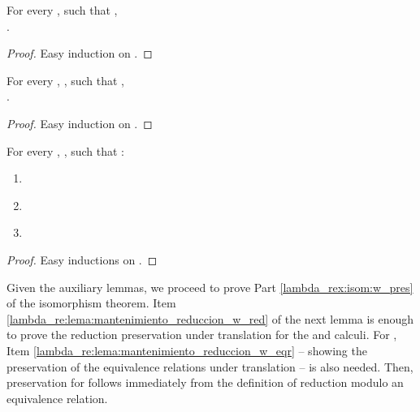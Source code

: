 \begin{lemma}\label{lambda_re:lema:w_swap}
For every ,  such that ,\\
.
    \begin{proof}
    \vspace{-.07cm}
    Easy induction on .
    \end{proof}
\end{lemma}

\begin{lemma}\label{lambda_re:lema:w_incrementos}
For every , ,  such that , \\
.
    \begin{proof}
    \vspace{-.07cm}
    Easy induction on .
    \end{proof}
\end{lemma}

\begin{lemma}\label{lambda_regc:lema:w_gc}
For every , ,  such that  :
    \vspace{-.07cm}
    \begin{enumerate}
        \item \label{lambda_regc:lema:w_gc:not} 

        \item \label{lambda_regc:lema:w_gc:in} 

        \item \label{lambda_regc:lema:w_gc:dec} 
    \end{enumerate}
    \begin{proof}
    \vspace{-.07cm}
    Easy inductions on .
    \end{proof}
\end{lemma}

Given the auxiliary lemmas, we proceed to prove Part
\ref{lambda_rex:isom:w_pres} of the isomorphism theorem. Item
\ref{lambda_re:lema:mantenimiento_reduccion_w_red}
of the next lemma is enough to prove the reduction preservation under
translation  for the  and  calculi. For
, Item \ref{lambda_re:lema:mantenimiento_reduccion_w_eqr}
-- showing the preservation of the equivalence relations under
translation  -- is also needed. Then, preservation for
 follows immediately from the definition of reduction modulo an
equivalence relation.

